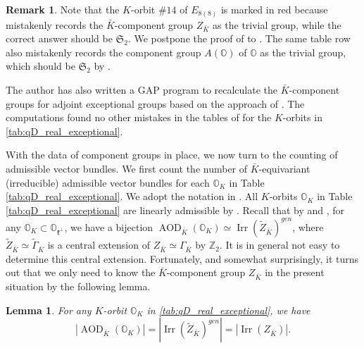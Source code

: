 \documentclass[11pt, a4paper]{amsart}
\newcommand{\orb}{\mathbb{O}}
\newcommand{\orbk}{\orb_{K}}
\newcommand{\Z}{\mathbb{Z}}
\newcommand{\fk}{\mathfrak{k}}
\newcommand{\fS}{\mathfrak{S}}
\newcommand{\tGamma}{\widetilde{\Gamma}}
\DeclareMathOperator{\AOD}{AOD}
\newcommand{\Irr}{\operatorname{Irr}}
\newtheorem{Lem}[Thm]{Lemma}
\theoremstyle{definition}
\newtheorem{Rem}[Thm]{Remark}
\numberwithin{equation}{section}
\begin{document}
\begin{Rem}\label{rem:Z_K}
	Note that the $K$-orbit $\# 14$ of $E_{8(8)}$ is marked in red because \cite[Table 11]{King} mistakenly records the $\bar{K}$-component group $Z_{\bar{K}}$ as the trivial group, while the correct answer should be $\fS_2$. We postpone the proof of  to . The same table row also mistakenly records the component group $A(\orb)$ of $\orb$ as the trivial group, which should be $\fS_2$ by \cite[Table 5]{Alexeevski}. 

	The author has also written a GAP program to recalculate the $\bar{K}$-component groups for adjoint exceptional groups based on the approach of \cite{KingNoel}. The computations found no other mistakes in the tables of \cite{King} for the $K$-orbits in \cref{tab:qD_real_exceptional}.
\end{Rem}

With the data of component groups in place, we now turn to the counting of admissible vector bundles.
We first count the number of $\bar{K}$-equivariant (irreducible) admissible vector bundles for each $\orbk$ in Table \ref{tab:qD_real_exceptional}. We adopt the notation in . All $K$-orbits $\orbk$ in Table \ref{tab:qD_real_exceptional} are linearly admissible by \cite{Noel1, Noel2}. Recall that by  and , for any $\orbk \subset \orb_{\fk^\perp}$, we have a bijection $\AOD_{\bar{K}}(\orbk) \simeq \Irr(\widetilde{Z}_{\bar{K}})^{gen}$, where $\widetilde{Z}_{\bar{K}} \simeq \tGamma_{\bar{K}}$ is a central extension of $Z_{\bar{K}} \simeq \Gamma_{\bar{K}}$ by $\Z_2$. It is in general not easy to determine this central extension.
Fortunately, and somewhat surprisingly, it turns out that we only need to know the $\bar{K}$-component group $Z_{\bar{K}}$ in the present situation by the following lemma.

\begin{Lem} \label{lem:adm_count_exceptional}
	For any $K$-orbit $\orbk$ in \cref{tab:qD_real_exceptional}, we have 
	\[ |\AOD_{\bar{K}}(\orbk)| = |\Irr(\widetilde{Z}_{\bar{K}})^{gen}| = |\Irr(Z_{\bar{K}})|. \] 
\end{Lem}
\end{document}
